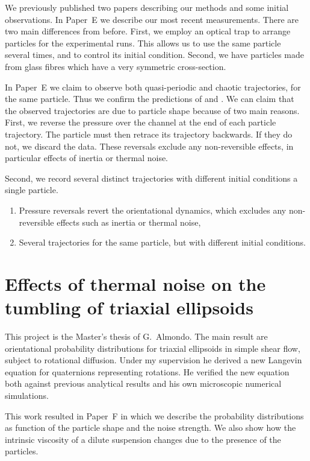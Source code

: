 \documentclass[thesis.tex]{subfiles}
\begin{document}
We previously published two papers \cite{mishra2012,einarsson2013} describing our methods and some initial observations. In Paper~E we describe our most recent measurements. There are two main differences from before. First, we employ an optical trap to arrange particles for the experimental runs. This allows us to use the same particle several times, and to control its initial condition. Second, we have particles made from glass fibres which have a very symmetric cross-section.

In Paper~E we claim to observe both quasi-periodic and chaotic trajectories, for the same particle. Thus we confirm the predictions of \citet{hinch1979} and \citet{yarin1997}. We can claim that the observed trajectories are due to particle shape because of two main reasons. First, we reverse the pressure over the channel at the end of each particle trajectory. The particle must then retrace its trajectory backwards. If they do not, we discard the data. These reversals exclude any non-reversible effects, in particular effects of inertia or thermal noise.

Second, we record several distinct trajectories with different initial conditions a single particle.
\begin{enumerate}
    \item Pressure reversals revert the orientational dynamics, which excludes any non-reversible effects such as inertia or thermal noise,
    \item Several trajectories for the same particle, but with different initial conditions.
\end{enumerate}

\chapter{Effects of thermal noise on the tumbling of triaxial ellipsoids}\label{sec:triaxialnoise}
This project is the Master's thesis of G.~Almondo. The main result are orientational probability distributions for triaxial ellipsoids in simple shear flow, subject to rotational diffusion. Under my supervision he derived a new Langevin equation for quaternions representing rotations. He verified the new equation both against previous analytical results \cite{rallison,brenner} and his own microscopic numerical simulations.

This work resulted in Paper~F in which we describe the probability distributions as function of the particle shape and the noise strength. We also show how the intrinsic viscosity of a dilute suspension changes due to the presence of the particles.
\end{document}
